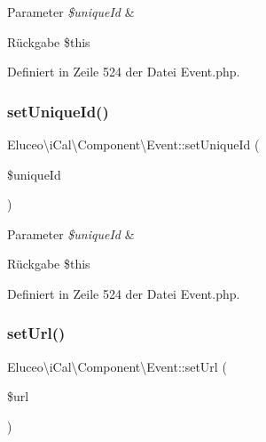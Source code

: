 \begin{DoxyParams}{Parameter}
{\em \$unique\+Id} & \\
\hline
\end{DoxyParams}
\begin{DoxyReturn}{Rückgabe}
\$this 
\end{DoxyReturn}


Definiert in Zeile 524 der Datei Event.\+php.

\mbox{\label{class_eluceo_1_1i_cal_1_1_component_1_1_event_ad71076351bbd5720b266b021d92d61cc}} 
\subsubsection{\texorpdfstring{set\+Unique\+Id()}{setUniqueId()}\hspace{0.1cm}{\footnotesize\ttfamily [3/3]}}
{\footnotesize\ttfamily Eluceo\textbackslash{}i\+Cal\textbackslash{}\+Component\textbackslash{}\+Event\+::set\+Unique\+Id (\begin{DoxyParamCaption}\item[{}]{\$unique\+Id }\end{DoxyParamCaption})}


\begin{DoxyParams}{Parameter}
{\em \$unique\+Id} & \\
\hline
\end{DoxyParams}
\begin{DoxyReturn}{Rückgabe}
\$this 
\end{DoxyReturn}


Definiert in Zeile 524 der Datei Event.\+php.

\mbox{\label{class_eluceo_1_1i_cal_1_1_component_1_1_event_a35034248d6c68ad41e8cd70e6ba17481}} 
\subsubsection{\texorpdfstring{set\+Url()}{setUrl()}\hspace{0.1cm}{\footnotesize\ttfamily [1/3]}}
{\footnotesize\ttfamily Eluceo\textbackslash{}i\+Cal\textbackslash{}\+Component\textbackslash{}\+Event\+::set\+Url (\begin{DoxyParamCaption}\item[{}]{\$url }\end{DoxyParamCaption})}



